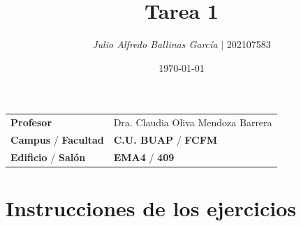 \documentclass{article}
\title{Tarea 1}
\author{\emph{Julio Alfredo Ballinas García} $\boldsymbol{\mid}$ 202107583}
\date{\today}
\begin{document}
\maketitle



\begin{mybox}
\noindent\begin{tabular}{@{}ll}
	{\bfseries{Profesor}} & Dra. Claudia Oliva Mendoza Barrera\\
	\textcolor{prussianblue}{\bfseries{Campus}} / \textcolor{trueblue}{\bfseries{Facultad}}  & \textcolor{prussianblue}{\bfseries{C.U. BUAP}} /  \textcolor{trueblue}{\bfseries{FCFM}} \\
	\textcolor{prussianblue}{\bfseries{Edificio}} /  \textcolor{trueblue}{\bfseries{Salón}}    & 	\textcolor{prussianblue}{\bfseries{EMA4}} /  \textcolor{trueblue}{\bfseries{409}}   
\end{tabular} 
\end{mybox} \vspace{1cm}

\section{Instrucciones de los ejercicios}
\end{document}
